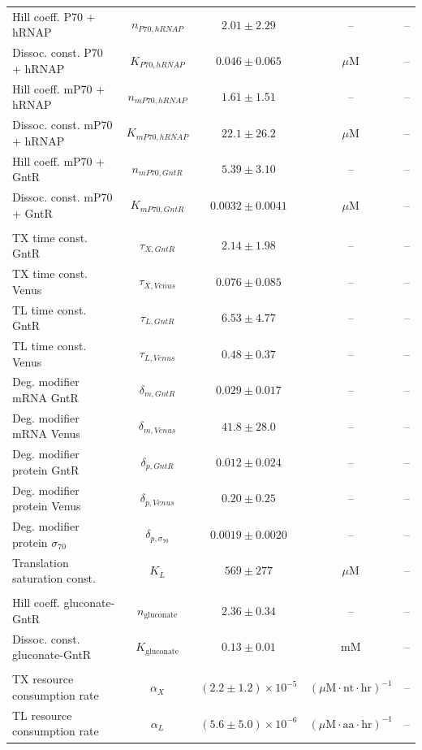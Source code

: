 \documentclass[12pt]{article}
\begin{document}
\begin{table}[ht!]
{\begin{tabular}{lcccc}
Hill coeff. P70 + hRNAP & $n_{P70,hRNAP}$ & $2.01 \pm 2.29$ & -- & -- \\
Dissoc. const. P70 + hRNAP & $K_{P70,hRNAP}$ & $0.046 \pm 0.065$ & $\mu$M & -- \\
Hill coeff. mP70 + hRNAP & $n_{mP70,hRNAP}$ & $1.61 \pm 1.51$ & -- & -- \\
Dissoc. const. mP70 + hRNAP & $K_{mP70,hRNAP}$ & $22.1 \pm 26.2$ & $\mu$M & -- \\
Hill coeff. mP70 + GntR & $n_{mP70,GntR}$ & $5.39 \pm 3.10$ & -- & -- \\
Dissoc. const. mP70 + GntR & $K_{mP70,GntR}$ & $0.0032 \pm 0.0041$ & $\mu$M & -- \\
& & & & \\
TX time const. GntR & $\tau_{X,GntR}$ & $2.14 \pm 1.98$ & -- & -- \\
TX time const. Venus & $\tau_{X,Venus}$ & $0.076 \pm 0.085$ & -- & -- \\
TL time const. GntR & $\tau_{L,GntR}$ & $6.53 \pm 4.77$ & -- & -- \\
TL time const. Venus & $\tau_{L,Venus}$ & $0.48 \pm 0.37$ & -- & -- \\
Deg. modifier mRNA GntR & $\delta_{m,GntR}$ & $0.029 \pm 0.017$ & -- & -- \\
Deg. modifier mRNA Venus & $\delta_{m,Venus}$ & $41.8 \pm 28.0$ & -- & -- \\
Deg. modifier protein GntR & $\delta_{p,GntR}$ & $0.012 \pm 0.024$ & -- & -- \\
Deg. modifier protein Venus & $\delta_{p,Venus}$ & $0.20 \pm 0.25$ & -- & -- \\
Deg. modifier protein $\sigma_{70}$ & $\delta_{p,\sigma_{70}}$ & $0.0019 \pm 0.0020$ & -- & -- \\
Translation saturation const. & $K_L$ & $569 \pm 277$ & $\mu$M & -- \\
& & & & \\
Hill coeff. gluconate-GntR & $n_{\text{gluconate}}$ & $2.36 \pm 0.34$ & -- & -- \\
Dissoc. const. gluconate-GntR & $K_{\text{gluconate}}$ & $0.13 \pm 0.01$ & mM & -- \\
& & & & \\
TX resource consumption rate & $\alpha_X$ & $(2.2 \pm 1.2) \times 10^{-5}$ & $(\mu\text{M}\cdot\text{nt}\cdot\text{hr})^{-1}$ & -- \\
TL resource consumption rate & $\alpha_L$ & $(5.6 \pm 5.0) \times 10^{-6}$ & $(\mu\text{M}\cdot\text{aa}\cdot\text{hr})^{-1}$ & -- \\
\bottomrule
\end{tabular}}
\label{table:model-parameters}
\end{table}

\clearpage

\renewcommand\thefigure{S\arabic{figure}}
\renewcommand\thetable{T\arabic{table}}
\renewcommand\thepage{S-\arabic{page}}
\renewcommand\theequation{S\arabic{equation}}

\setcounter{equation}{0}
\setcounter{table}{0}
\setcounter{figure}{0}

\nocite{moon2012genetic}

\end{document}
